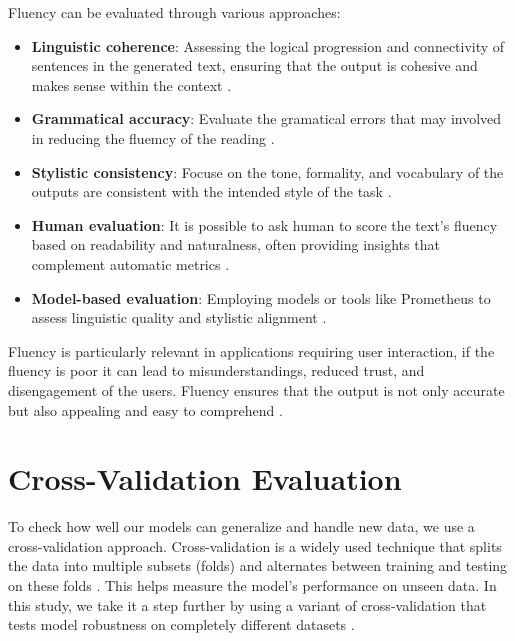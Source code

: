 Fluency can be evaluated through various approaches:
\begin{itemize}
    \item \textbf{Linguistic coherence}: Assessing the logical progression and connectivity of sentences in the generated text, ensuring that the output is cohesive and makes sense within the context \citep{gat2023faithfulexplanationsblackboxnlp}.
    \item \textbf{Grammatical accuracy}: Evaluate the gramatical errors that may involved in reducing the fluemcy of the reading \citep{varshney-etal-2022-towards}.
    \item \textbf{Stylistic consistency}: Focuse on the tone, formality, and vocabulary of the outputs are consistent with the intended style of the task \citep{yao2023predictinggeneralizationperformancecorrectness}.
    \item \textbf{Human evaluation}: It is possible to ask human to score the text's fluency based on readability and naturalness, often providing insights that complement automatic metrics \citep{jacovi-goldberg-2020-towards}.
    \item \textbf{Model-based evaluation}: Employing models or tools like Prometheus to assess linguistic quality and stylistic alignment \citep{kim2024prometheus2opensource}.
\end{itemize}

Fluency is particularly relevant in applications requiring user interaction, if the fluency is poor it can lead to misunderstandings, reduced trust, and disengagement of the users. Fluency ensures that the output is not only accurate but also appealing and easy to comprehend \citep{jacovi-goldberg-2020-towards}.

\section{Cross-Validation Evaluation}

To check how well our models can generalize and handle new data, we use a cross-validation approach. Cross-validation is a widely used technique that splits the data into multiple subsets (folds) and alternates between training and testing on these folds \citep{jiang2017markov, carmack2012generalised, Bergmeir2012On}. This helps measure the model's performance on unseen data. In this study, we take it a step further by using a variant of cross-validation that tests model robustness on completely different datasets \citep{Barratt2018OptimizingFG}.

